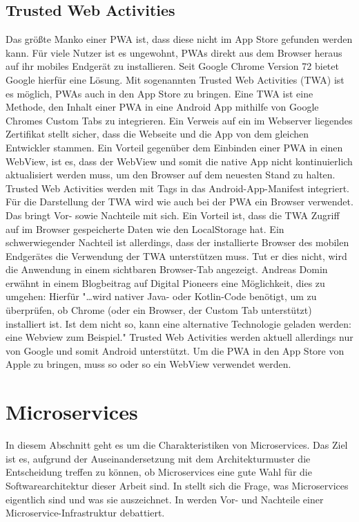 \subsection{Trusted Web Activities}
\label{subsec:trustedwebactivities}
Das größte Manko einer PWA ist, dass diese nicht im App Store gefunden werden kann.
Für viele Nutzer ist es ungewohnt, PWAs direkt aus dem Browser heraus auf ihr mobiles Endgerät zu installieren.
Seit Google Chrome Version 72 bietet Google hierfür eine Lösung.
Mit sogenannten Trusted Web Activities (TWA) ist es möglich, PWAs auch in den App Store
zu bringen. Eine TWA ist eine Methode, den Inhalt einer PWA in eine Android App mithilfe
von Google Chromes Custom Tabs zu integrieren.\cite{TrustedWebActivitiesGoogle}
Ein Verweis auf ein im Webserver liegendes Zertifikat stellt sicher,
dass die Webseite und die App von dem gleichen Entwickler
stammen. Ein Vorteil gegenüber dem Einbinden einer PWA in einen WebView, ist es,
dass der WebView und somit die native App nicht kontinuierlich aktualisiert werden muss,
um den Browser auf dem neuesten Stand zu halten.
Trusted Web Activities werden mit  Tags in das Android-App-Manifest integriert. Für die Darstellung
der TWA wird wie auch bei der PWA ein Browser verwendet. Das bringt Vor- sowie Nachteile mit sich.
Ein Vorteil ist, dass die TWA Zugriff auf im Browser gespeicherte Daten wie den LocalStorage
hat. Ein schwerwiegender Nachteil ist allerdings, dass der installierte Browser des mobilen Endgerätes
die Verwendung der TWA unterstützen muss. Tut er dies nicht, wird die Anwendung in einem sichtbaren
Browser-Tab angezeigt. Andreas Domin erwähnt in einem Blogbeitrag auf Digital Pioneers eine Möglichkeit,
dies zu umgehen: Hierfür "\dots wird nativer Java- oder Kotlin-Code benötigt, um zu überprüfen, ob Chrome
(oder ein Browser, der Custom Tab unterstützt) installiert ist.
Ist dem nicht so, kann eine alternative Technologie geladen werden:
eine Webview zum Beispiel."\cite[2. Abschnitt]{TrustedWebActivitiesT3N}
Trusted Web Activities werden aktuell allerdings nur von Google und somit Android unterstützt. Um die PWA
in den App Store von Apple zu bringen, muss so oder so ein WebView verwendet werden.

\section{Microservices}
\label{sec:microservices}
In diesem Abschnitt geht es um die Charakteristiken von Microservices. Das Ziel ist es,
aufgrund der Auseinandersetzung mit dem Architekturmuster die Entscheidung treffen zu können, ob Microservices
eine gute Wahl für die Softwarearchitektur dieser Arbeit sind. In 
stellt sich die Frage, was Microservices eigentlich sind und was sie auszeichnet. In
 werden Vor- und Nachteile einer Microservice-Infrastruktur
debattiert.

